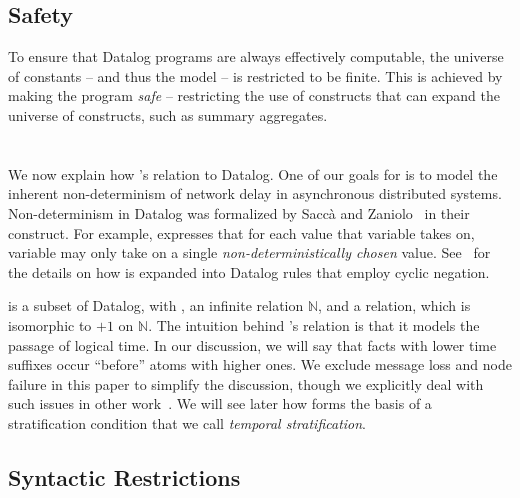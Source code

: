 \subsection{Safety}

To ensure that Datalog programs are always effectively computable, the universe
of constants -- and thus the model -- is restricted to be finite.  This is
achieved by making the program {\em safe} -- restricting the use of constructs
that can expand the universe of constructs, such as summary aggregates.

\section{\lang}

We now explain how \lang's relation to Datalog.  One of our goals for \lang is to model the inherent non-determinism of network
delay in asynchronous distributed systems.  Non-determinism in Datalog was
formalized by Sacc\`{a} and Zaniolo~\cite{sacca-zaniolo} in their
 construct.  For example,
 expresses that for each value
that variable  takes on, variable  may only take on a
single {\em non-deterministically chosen} value. 
See~\cite{sacca-zaniolo} for the details on how  is expanded
into Datalog rules that employ cyclic negation.

\lang is a subset of Datalog, with , an infinite
 relation $\mathbb{N}$, and a 
relation, which is isomorphic to $+1$ on $\mathbb{N}$.  The intuition behind
\lang's  relation is that it models the passage of logical
time.  In our discussion, we will say that facts with lower time suffixes occur
``before'' atoms with higher ones.  
We exclude message loss and node failure in this paper to
simplify the discussion, though we explicitly deal with such issues in other
work~\cite{dedalus-techr, netdb}.
We will see later how  forms the basis of a stratification
condition that we call {\em temporal stratification}.

\subsection{Syntactic Restrictions}
\label{sec:syntaxrestrictions}

